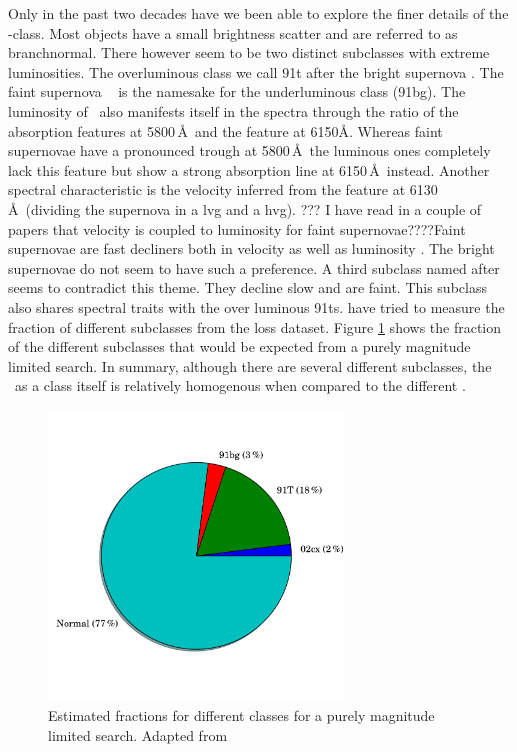 Only in the past two decades have we been able to explore the finer details of the \sneia-class. Most objects have a small brightness scatter and are referred to as \gls{branchnormal}. There however seem to be two distinct subclasses with extreme luminosities. The overluminous class we call \gls{91t} after the bright supernova  \citet{1992AJ....103.1632P}. The faint supernova \ \citep{1992AJ....104.1543F} is the namesake for the underluminous class (\gls{91bg}). The luminosity of \sneia\ also manifests itself in the spectra through the ratio of the  absorption features at 5800\,\AA\ and the feature at 6150\AA. Whereas faint supernovae have a pronounced trough at 5800\,\AA\ the luminous ones completely lack this feature but show a strong absorption line at 6150\,\AA\ instead. Another spectral characteristic is the velocity inferred from the  feature at 6130\,\AA\ (dividing the supernova in a \gls{lvg} and a \gls{hvg}). ??? I have read in a couple of papers that velocity is coupled to luminosity for faint supernovae????Faint supernovae are fast decliners both in velocity as well as luminosity \citet{2005ApJ...623.1011B}. The bright supernovae do not seem to have such a preference. A third subclass named after \ \citep{2003PASP..115..453L} seems to contradict this theme. They decline slow and are faint. This subclass also shares spectral traits with the over luminous \glspl{91t}. \citet{2011MNRAS.412.1441L} have tried to measure the fraction of different subclasses from the \gls{loss} dataset. Figure \ref{fig:ia_fracs} shows the fraction of the different subclasses that would be expected from a purely magnitude limited search. In summary, although there are several different subclasses, the \snia\ as a class itself is relatively homogenous when compared to the different \sneii.

\begin{figure}[htbp] %
   \centering
   \includegraphics[width=0.7\textwidth, trim=0 2.5cm 0 0cm]{chapter_intro/plots/plot_ia_fracs.pdf} 
   \caption[Fraction of different SN Ia classes]{Estimated fractions for different  classes for a purely magnitude limited search. Adapted from \citet{2011MNRAS.412.1441L}}
   \label{fig:ia_fracs}
\end{figure}

